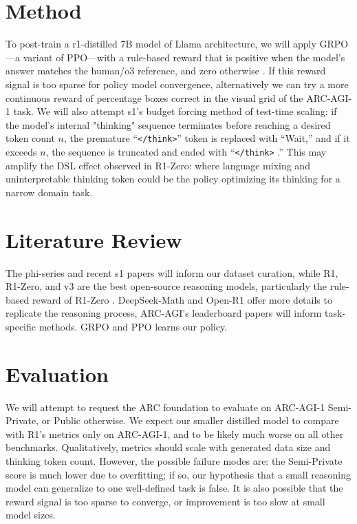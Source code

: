 \documentclass{article}
\begin{document}
\section{Method}
To post-train a r1-distilled 7B model of Llama architecture, we will apply GRPO—a variant of PPO—with a rule-based reward that is positive when the model's answer matches the human/o3 reference, and zero otherwise \cite{PPO, GRPO}. If this reward signal is too sparse for policy model convergence, alternatively we can try a more continuous reward of percentage boxes correct in the visual grid of the ARC-AGI-1 task. We will also attempt s1's budget forcing method of test-time scaling: if the model's internal "thinking" sequence terminates before reaching a desired token count \(n\), the premature ``\texttt{</think>}'' token is replaced with ``Wait,'' and if it exceeds \(n\), the sequence is truncated and ended with ``\texttt{</think>} \cite{s1}.'' This may amplify the DSL effect observed in R1-Zero: where language mixing and uninterpretable thinking token could be the policy optimizing its thinking for a narrow domain task.

\section{Literature Review}
The phi-series and recent s1 papers will inform our dataset curation, while R1, R1-Zero, and v3 are the best open-source reasoning models, particularly the rule-based reward of R1-Zero \cite{phi3}. DeepSeek-Math and Open-R1 offer more details to replicate the reasoning process, ARC-AGI's leaderboard papers will inform task-specific methods. GRPO and PPO learns our policy.

\section{Evaluation}
We will attempt to request the ARC foundation to evaluate on ARC-AGI-1 Semi-Private, or Public otherwise.
We expect our smaller distilled model to compare with R1's metrics only on ARC-AGI-1, and to be likely much worse on all other benchmarks. Qualitatively, metrics should scale with generated data size and thinking token count. However, the possible failure modes are: the Semi-Private score is much lower due to overfitting; if so, our hypothesis that a small reasoning model can generalize to one well-defined task is false. It is also possible that the reward signal is too sparse to converge, or improvement is too slow at small model sizes.



\end{document}

